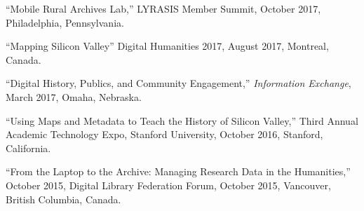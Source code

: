 ``Mobile Rural Archives Lab,'' LYRASIS Member Summit, October 2017,
Philadelphia, Pennsylvania.

``Mapping Silicon Valley'' Digital Humanities 2017, August 2017,
Montreal, Canada.

``Digital History, Publics, and Community Engagement,''
\emph{Information Exchange}, March 2017, Omaha, Nebraska.

``Using Maps and Metadata to Teach the History of Silicon Valley,''
Third Annual Academic Technology Expo, Stanford University, October
2016, Stanford, California.

``From the Laptop to the Archive: Managing Research Data in the
Humanities,'' October 2015, Digital Library Federation Forum, October
2015, Vancouver, British Columbia, Canada.
